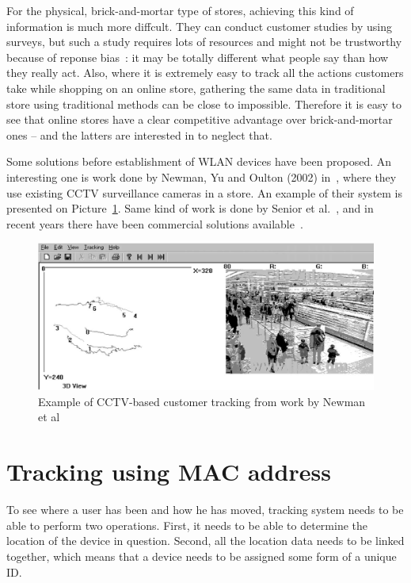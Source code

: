 \documentclass[12pt,a4paper,oneside,pdftex]{report}
\begin{document}
For the physical, brick-and-mortar type of stores, achieving this kind of information is much more diffcult. They can conduct customer studies by using surveys, but such a study requires lots of resources and might not be trustworthy because of reponse bias~\cite{Furnham1986385}: it may be totally different what people say than how they really act. Also, where it is extremely easy to track all the actions customers take while shopping on an online store, gathering the same data in traditional store using traditional methods can be close to impossible. Therefore it is easy to see that online stores have a clear competitive advantage over brick-and-mortar ones -- and the latters are interested in to neglect that.

Some solutions before establishment of WLAN devices have been proposed. An interesting one is work done by Newman, Yu and Oulton (2002) in~\cite{Newman2002253}, where they use existing CCTV surveillance cameras in a store. An example of their system is presented on Picture~\ref{fig:cctv_tracking}. Same kind of work is done by Senior et al.~\cite{senior2007video}, and in recent years there have been commercial solutions available~\cite{retailcctv}.

\begin{figure}
    \label{fig:cctv_tracking}
    \includegraphics[width=\textwidth]{images/cctv_tracking_newman_pic1}
    \caption{Example of CCTV-based customer tracking from work by Newman et al~\cite{Newman2002253}}
\end{figure}


\section{Tracking using MAC address}
\label{sec:mac_tracking}

To see where a user has been and how he has moved, tracking system needs to be able to perform two operations. First, it needs to be able to determine the location of the device in question. Second, all the location data needs to be linked together, which means that a device needs to be assigned some form of a unique ID.
\end{document}
